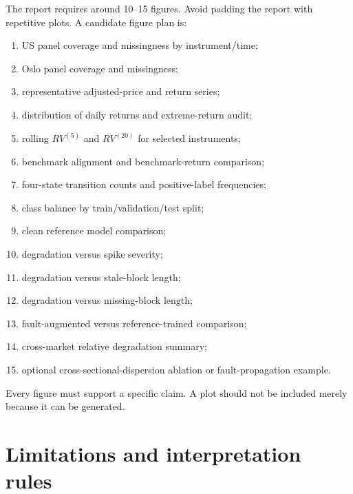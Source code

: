 \documentclass[11pt,a4paper]{article}
\begin{document}
The report requires around 10--15 figures. Avoid padding the report with repetitive plots. A candidate figure plan is:
\begin{enumerate}
  \item US panel coverage and missingness by instrument/time;
  \item Oslo panel coverage and missingness;
  \item representative adjusted-price and return series;
  \item distribution of daily returns and extreme-return audit;
  \item rolling $RV^{(5)}$ and $RV^{(20)}$ for selected instruments;
  \item benchmark alignment and benchmark-return comparison;
  \item four-state transition counts and positive-label frequencies;
  \item class balance by train/validation/test split;
  \item clean reference model comparison;
  \item degradation versus spike severity;
  \item degradation versus stale-block length;
  \item degradation versus missing-block length;
  \item fault-augmented versus reference-trained comparison;
  \item cross-market relative degradation summary;
  \item optional cross-sectional-dispersion ablation or fault-propagation example.
\end{enumerate}

Every figure must support a specific claim. A plot should not be included merely because it can be generated.

\section{Limitations and interpretation rules}
\label{sec:limitations}
\end{document}

